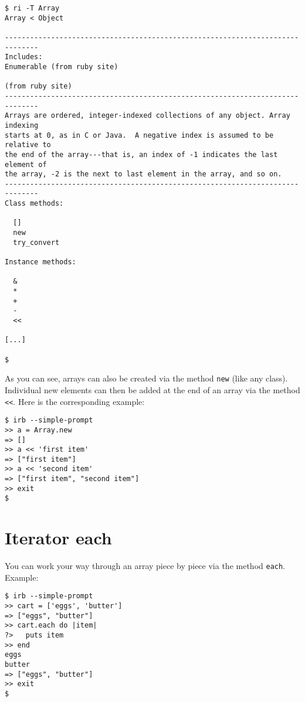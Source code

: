 \documentclass[a4paper]{book}
\begin{document}
\begin{shaded}\begin{verbatim}
$ ri -T Array
Array < Object

------------------------------------------------------------------------------
Includes:
Enumerable (from ruby site)

(from ruby site)
------------------------------------------------------------------------------
Arrays are ordered, integer-indexed collections of any object. Array indexing
starts at 0, as in C or Java.  A negative index is assumed to be relative to
the end of the array---that is, an index of -1 indicates the last element of
the array, -2 is the next to last element in the array, and so on.
------------------------------------------------------------------------------
Class methods:

  []
  new
  try_convert

Instance methods:

  &
  *
  +
  -
  <<

[...]

$
\end{verbatim}\end{shaded}

As you can see, arrays can also be created via the method \texttt{new} (like any class). Individual new elements can then be added at the end of an array via the method \texttt{\textless{}\textless{}}. Here is the corresponding example:

\begin{shaded}\begin{verbatim}
$ irb --simple-prompt
>> a = Array.new
=> []
>> a << 'first item'
=> ["first item"]
>> a << 'second item'
=> ["first item", "second item"]
>> exit
$
\end{verbatim}\end{shaded}

\section{Iterator each}\label{iterator-each}

You can work your way through an array piece by piece via the method \texttt{each}. Example:

\begin{shaded}\begin{verbatim}
$ irb --simple-prompt
>> cart = ['eggs', 'butter']
=> ["eggs", "butter"]
>> cart.each do |item|
?>   puts item
>> end
eggs
butter
=> ["eggs", "butter"]
>> exit
$
\end{verbatim}\end{shaded}
\end{document}
